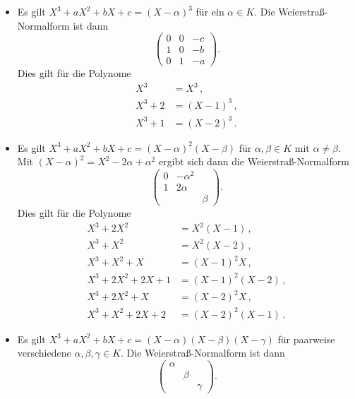 \begin{itemize}
  \item
    Es gilt $X^3 + a X^2 + b X + c = (X - \alpha)^3$ für ein $\alpha \in K$.
    Die Weierstraß-Normalform  ist dann
    \[
      \begin{pmatrix}
        0 & 0 & -c  \\
        1 & 0 & -b  \\
        0 & 1 & -a
      \end{pmatrix}.
    \]
    Dies gilt für die Polynome
    \begin{align*}
      X^3     &= X^3      \,, \\
      X^3 + 2 &= (X-1)^3  \,, \\
      X^3 + 1 &= (X-2)^3  \,.
    \end{align*}
  \item
    Es gilt $X^3 + a X^2 + b X + c = (X - \alpha)^2 (X - \beta)$ für $\alpha, \beta \in K$ mit $\alpha \neq \beta$.
    Mit $(X - \alpha)^2 = X^2 - 2 \alpha + \alpha^2$ ergibt sich dann die Weierstraß-Normalform
    \[
      \begin{pmatrix}
        0 & -\alpha^2 &       \\
        1 &  2\alpha  &       \\
          &           & \beta
      \end{pmatrix}.
    \]
    Dies gilt für die Polynome
    \begin{align*}
      X^3 + 2 X^2           &=  X^2 (X - 1)   \,,   \\
      X^3 +   X^2           &=  X^2 (X - 2)   \,,   \\
      X^3 +   X^2 +   X     &=  (X-1)^2 X     \,,   \\
      X^3 + 2 X^2 + 2 X + 1 &=  (X-1)^2 (X-2) \,,   \\
      X^3 + 2 X^2 +   X     &=  (X-2)^2 X     \,,   \\
      X^3 +   X^2 + 2 X + 2 &=  (X-2)^2 (X-1) \,.
    \end{align*}
  \item
    Es gilt $X^3 + a X^2 + b X + c = (X - \alpha)(X - \beta)(X - \gamma)$ für paarweise verschiedene $\alpha, \beta, \gamma \in K$.
    Die Weierstraß-Normalform ist dann
    \[
      \begin{pmatrix}
        \alpha  &       &         \\
                & \beta &         \\
                &       & \gamma
      \end{pmatrix}.
\]
\end{itemize}
